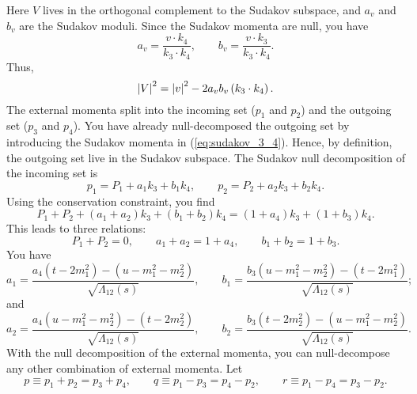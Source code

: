 Here $V$ lives in the orthogonal complement to the Sudakov subspace, and $a_{v}$ and $b_{v}$ are the Sudakov moduli. Since the Sudakov momenta are null, you have
\begin{equation}
	a_{v} = \frac{v \cdot k_{4}}{k_{3} \cdot k_{4}}, \qquad b_{v} = \frac{v \cdot k_{3}}{k_{3} \cdot k_{4}}.
\end{equation}
Thus,
\begin{equation}
	\left\lvert V \right\rvert^{2} = \left\lvert v \right\rvert^{2} - 2 a_{v} b_{v} \left( k_{3} \cdot k_{4} \right).
\end{equation}
The external momenta split into the incoming set ($p_{1}$ and $p_{2}$) and the outgoing set ($p_{3}$ and $p_{4}$). You have already null-decomposed the outgoing set by introducing the Sudakov momenta in (\ref{eq:sudakov_3_4}). Hence, by definition, the outgoing set live in the Sudakov subspace. The Sudakov null decomposition of the incoming set is
\begin{equation}
	p_{1} = P_{1} + a_{1} k_{3} + b_{1} k_{4}, \qquad p_{2} = P_{2} + a_{2} k_{3} + b_{2} k_{4}.
\end{equation}
Using the conservation constraint, you find
\begin{equation}
	P_{1} + P_{2} + \left( a_{1} + a_{2} \right) k_{3} + \left( b_{1} + b_{2} \right) k_{4} = \left( 1 + a_{4} \right) k_{3} + \left( 1 + b_{3} \right) k_{4}.
\end{equation}
This leads to three relations:
\begin{equation}
	P_{1} + P_{2} = 0, \qquad a_{1} + a_{2} = 1 + a_{4}, \qquad b_{1} + b_{2} = 1 + b_{3}.
	\label{eq:conv_rel}
\end{equation}
You have
\begin{equation}
	a_{1} = \frac{a_{4} \left( t - 2 m_{1}^{2} \right) - \left( u - m_{1}^{2} - m_{2}^{2} \right) }{\sqrt{\Lambda_{12}(s)}}, \qquad
	b_{1} = \frac{b_{3} \left( u - m_{1}^{2} - m_{2}^{2} \right) - \left( t - 2 m_{1}^{2} \right) }{\sqrt{\Lambda_{12}(s)}};
\end{equation}
and
\begin{equation}
	a_{2} = \frac{a_{4} \left( u - m_{1}^{2} - m_{2}^{2} \right) - \left( t - 2 m_{2}^{2} \right) }{\sqrt{\Lambda_{12}(s)}}, \qquad
	b_{2} = \frac{b_{3} \left( t - 2 m_{2}^{2} \right) - \left( u - m_{1}^{2} - m_{2}^{2} \right) }{\sqrt{\Lambda_{12}(s)}}.
\end{equation}
With the null decomposition of the external momenta, you can null-decompose any other combination of external momenta. Let
\begin{equation}
	p \equiv p_{1} + p_{2} = p_{3} + p_{4}, \qquad q \equiv p_{1} - p_{3} = p_{4} - p_{2}, \qquad r \equiv p_{1} - p_{4} = p_{3} - p_{2}.
\end{equation}
